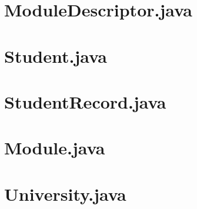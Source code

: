 \documentclass{article}
\begin{document}
\section{ModuleDescriptor.java}


\section{Student.java}


\section{StudentRecord.java}


\section{Module.java}


\section{University.java}

\end{document}
